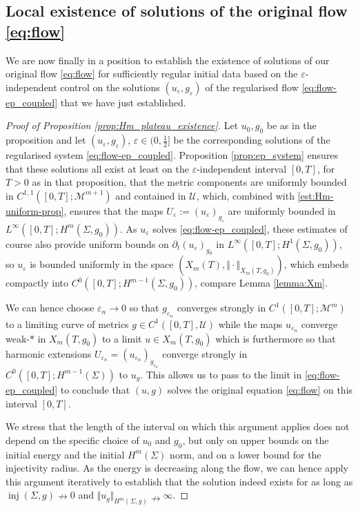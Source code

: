 \documentclass[10pt,reqno]{amsart}
\theoremstyle{plain}
\theoremstyle{definition}
\numberwithin{equation}{section}
\newcommand{\Si}{\Sigma}
\newcommand{\ep}{\varepsilon}
\DeclareMathOperator{\inj}{inj}
\newcommand{\norm}[1]{\Vert#1\Vert}
\newcommand{\half}{\frac{1}{2}}
\newcommand{\pt}{\partial_t}
\newcommand{\eps}{\varepsilon}
\newcommand{\MM}{\mathcal{M}} %
\newcommand{\UU}{{\mathcal U}}
\begin{document}
\subsection{Local existence of solutions of the original flow \eqref{eq:flow}}\label{subsec:Hm-loc-exist}
We are now finally in a position to establish the existence of solutions of our original flow \eqref{eq:flow} for sufficiently regular initial data based on the $\ep$-independent control on the solutions $(u_\eps,g_\eps)$ of the regularised flow \eqref{eq:flow-ep_coupled} that we have just established. 
%
\begin{proof}[Proof of Proposition \ref{prop:Hm_plateau_existence}]
    Let $u_0,g_0$ be as in the proposition and let $(u_\eps,g_\eps)$, $\eps\in (0,\half]$ be the corresponding solutions of the regularised system \eqref{eq:flow-ep_coupled}. Proposition \ref{prop:ep_system} ensures that these solutions all  exist at least on the $\eps$-independent interval $[0,T]$, for $T>0$ as in that proposition, that the metric components are uniformly bounded in $C^{1,1}([0,T];\MM^{m+1})$ and contained in $\UU$, which, combined with \eqref{est:Hm-uniform-prop}, ensures that  the maps $U_\ep := (u_\ep)_{g_\ep}$ are uniformly bounded in $L^\infty([0,T];H^m(\Si,g_0))$. As $u_\eps$ solves \eqref{eq:flow-ep_coupled}, these estimates of course also provide uniform bounds on $\pt (u_\eps)_{g_0}$ in $L^\infty([0,T];H^1(\Si,g_0))$, so $u_\eps$ is bounded uniformly in the space $(X_m(T),\norm{\cdot}_{X_m(T,g_0)})$, which embeds compactly into $C^0([0,T];H^{m-1}(\Si,g_0))$, compare Lemma \ref{lemma:Xm}.
     
    We can hence choose $\eps_n\to 0$ so that $g_{\ep_n}$ converges strongly in $C^1([0,T];\MM^{m})$ to a limiting curve of metrics $g\in C^1([0,T], \UU)$ while the maps $u_{\eps_n}$ converge weak-$*$ in $ X_m(T,g_0)$ to a limit $u\in  X_m(T,g_0)$ which is furthermore so that  harmonic extensions $U_{\eps_n}=(u_{\eps_n})_{g_{\eps_n}}$ converge strongly in $C^0([0,T];H^{m-1}(\Si))$ to $u_g$.  
    This allows us to pass to the limit in \eqref{eq:flow-ep_coupled} to conclude that $(u,g)$ solves the original equation \eqref{eq:flow} on this interval $[0,T]$.
    
    We stress that the length of the interval on which this argument applies does not depend on the specific choice of $u_0$ and $g_0$, but only on upper bounds on the initial energy and the initial $H^m(\Si)$ norm, and on a lower bound for the injectivity radius. As the energy is decreasing along the flow, 
we can hence apply this argument iteratively to establish that the solution indeed exists for as long as $\inj(\Si,g)\nrightarrow 0$ and $\norm{u_g}_{H^m(\Si,g)}\nrightarrow \infty$. 
\end{proof}
\end{document}

